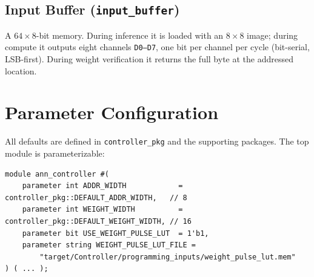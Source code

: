 \documentclass[11pt,a4paper]{article}
\begin{document}
\subsection{Input Buffer (\texttt{input\_buffer})}
A $64\times8$-bit memory. During inference it is loaded with an $8\times8$
image; during compute it outputs eight channels \texttt{D0--D7}, one bit per
channel per cycle (bit-serial, LSB-first). During weight verification it returns
the full byte at the addressed location.

\section{Parameter Configuration}

All defaults are defined in \texttt{controller\_pkg} and the supporting
packages. The top module is parameterizable:

\begin{lstlisting}[style=verilog]
module ann_controller #(
    parameter int ADDR_WIDTH            = controller_pkg::DEFAULT_ADDR_WIDTH,   // 8
    parameter int WEIGHT_WIDTH          = controller_pkg::DEFAULT_WEIGHT_WIDTH, // 16
    parameter bit USE_WEIGHT_PULSE_LUT  = 1'b1,
    parameter string WEIGHT_PULSE_LUT_FILE =
        "target/Controller/programming_inputs/weight_pulse_lut.mem"
) ( ... );
\end{lstlisting}
\end{document}
